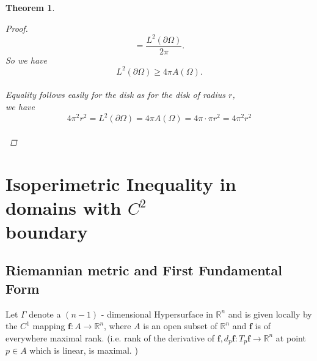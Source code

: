 \documentclass[oneside]{book}
\newtheorem{theorem}{Theorem}[section]
\begin{document}
\begin{theorem}
\begin{proof}
			$$=\frac{L^{2}(\partial \Omega)}{2 \pi}.$$ 
			So we have $$L^{2}(\partial \Omega) \geq 4 \pi A(\Omega).$$\\
			Equality follows  easily for the disk as for the disk of radius $r$, \\
			we have
			$$ 4 \pi^{2}r^{2} = L^{2}(\partial \Omega) = 4 \pi A(\Omega) = 4 \pi \cdot \pi r^{2} = 4 \pi^{2}r^{2} $$ \\
			
		\end{proof}
	\end{theorem}
	
	
	
	
	
	
	
	\section{Isoperimetric Inequality in domains with $C^{2}$ \\boundary} 
	\label{s:3}
	
	
	
	
	
	
	
	
	
	\subsection{Riemannian metric and First Fundamental Form}
	\label{ss:12}
	Let $\Gamma$ denote a $(n - 1) $ - dimensional Hypersurface in $\mathbb{R}^n$ and is given locally by the $C^{1}$ mapping 
	$\boldsymbol{f}:A \rightarrow \mathbb{R}^n$, where $A$ is an open subset of $\mathbb{R}^n$  and $\boldsymbol{f}$ is of everywhere maximal rank. (i.e. rank of the derivative of $
	\boldsymbol{f},  d_{p}\boldsymbol{f}:T_{p}\boldsymbol{f} \rightarrow \mathbb{R}^n $ at point $ p \in A$ which is linear, is maximal.  )\\
	
\end{document}
